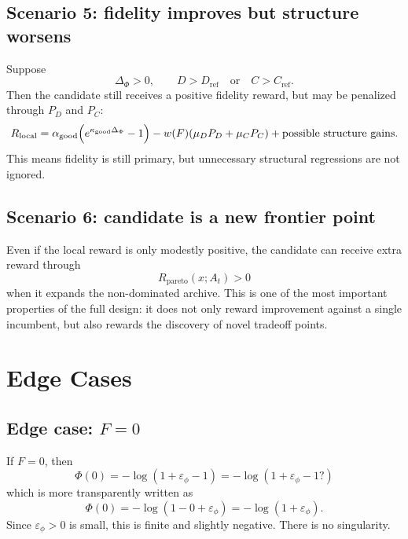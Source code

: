 \documentclass[11pt]{article}
\begin{document}
\subsection{Scenario 5: fidelity improves but structure worsens}

Suppose
\begin{equation}
    \Delta_{\Phi}>0,
    \qquad
    D>D_{\mathrm{ref}}
    \quad\text{or}\quad
    C>C_{\mathrm{ref}}.
\end{equation}
Then the candidate still receives a positive fidelity reward, but may be penalized through $P_D$ and $P_C$:
\begin{equation}
    R_{\mathrm{local}}=
    \alpha_{\mathrm{good}}\Bigl(e^{\kappa_{\mathrm{good}}\Delta_{\Phi}}-1\Bigr)
    -w(F)(\mu_D P_D+\mu_C P_C)
    + \text{possible structure gains}.
\end{equation}
This means fidelity is still primary, but unnecessary structural regressions are not ignored.

\subsection{Scenario 6: candidate is a new frontier point}

Even if the local reward is only modestly positive, the candidate can receive extra reward through
\begin{equation}
    R_{\mathrm{pareto}}(x;A_t)>0
\end{equation}
when it expands the non-dominated archive.
This is one of the most important properties of the full design: it does not only reward improvement against a single incumbent, but also rewards the discovery of novel tradeoff points.

\section{Edge Cases}

\subsection{Edge case: $F=0$}

If $F=0$, then
\begin{equation}
    \Phi(0) = -\log(1+\varepsilon_{\phi}-1) = -\log(1+\varepsilon_{\phi}-1?)
\end{equation}
which is more transparently written as
\begin{equation}
    \Phi(0) = -\log(1-0+\varepsilon_{\phi}) = -\log(1+\varepsilon_{\phi}).
\end{equation}
Since $\varepsilon_{\phi}>0$ is small, this is finite and slightly negative. There is no singularity.
\end{document}
